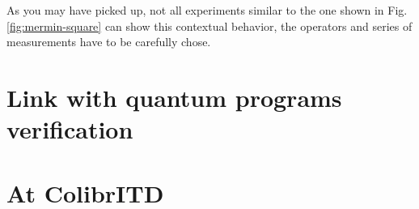 \documentclass{article}
\begin{document}
As you may have picked up, not all experiments similar to the one shown in Fig.
\ref{fig:mermin-square} can show this contextual behavior, the operators and
series of measurements have to be carefully chose.

\section{Link with quantum programs verification}
\label{sec:link_with_quantum_programs_verification}

\section*{At ColibrITD}



\end{document}
